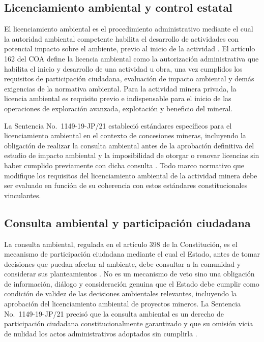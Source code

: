 \subsection{Licenciamiento ambiental y control estatal}

El licenciamiento ambiental es el procedimiento administrativo mediante el cual la autoridad ambiental competente habilita el desarrollo de actividades con potencial impacto sobre el ambiente, previo al inicio de la actividad \parencite{coa_2017}. El artículo 162 del COA define la licencia ambiental como la autorización administrativa que habilita el inicio y desarrollo de una actividad u obra, una vez cumplidos los requisitos de participación ciudadana, evaluación de impacto ambiental y demás exigencias de la normativa ambiental. Para la actividad minera privada, la licencia ambiental es requisito previo e indispensable para el inicio de las operaciones de exploración avanzada, explotación y beneficio del mineral.

La Sentencia No.\ 1149-19-JP/21 estableció estándares específicos para el licenciamiento ambiental en el contexto de concesiones mineras, incluyendo la obligación de realizar la consulta ambiental antes de la aprobación definitiva del estudio de impacto ambiental y la imposibilidad de otorgar o renovar licencias sin haber cumplido previamente con dicha consulta \parencite{cce_1149_19_jp_21}. Todo marco normativo que modifique los requisitos del licenciamiento ambiental de la actividad minera debe ser evaluado en función de su coherencia con estos estándares constitucionales vinculantes.

\subsection{Consulta ambiental y participación ciudadana}

La consulta ambiental, regulada en el artículo 398 de la Constitución, es el mecanismo de participación ciudadana mediante el cual el Estado, antes de tomar decisiones que puedan afectar al ambiente, debe consultar a la comunidad y considerar sus planteamientos \parencite{cre_2008}. No es un mecanismo de veto sino una obligación de información, diálogo y consideración genuina que el Estado debe cumplir como condición de validez de las decisiones ambientales relevantes, incluyendo la aprobación del licenciamiento ambiental de proyectos mineros. La Sentencia No.\ 1149-19-JP/21 precisó que la consulta ambiental es un derecho de participación ciudadana constitucionalmente garantizado y que su omisión vicia de nulidad los actos administrativos adoptados sin cumplirla \parencite{cce_1149_19_jp_21}.

